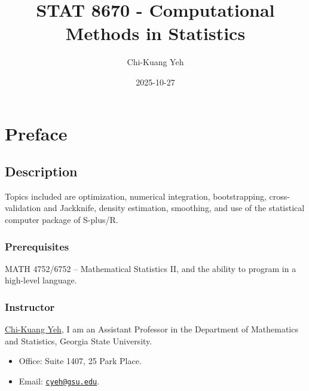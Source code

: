 \documentclass[
  letterpaper,
  DIV=11,
  numbers=noendperiod]{scrreprt}
\title{STAT 8670 - Computational Methods in Statistics}
\author{Chi-Kuang Yeh}
\date{2025-10-27}
\providecommand{\tightlist}{%
  \setlength{\itemsep}{0pt}\setlength{\parskip}{0pt}}
\renewcommand*\contentsname{Table of contents}
\newcommand\contentsname{Table of contents}
\begin{document}
\maketitle

\renewcommand*\contentsname{Table of contents}
{
\hypersetup{linkcolor=}
\setcounter{tocdepth}{2}
\tableofcontents
}


\chapter*{Preface}\label{preface}


\section*{Description}\label{description}


Topics included are optimization, numerical integration, bootstrapping,
cross-validation and Jackknife, density estimation, smoothing, and use
of the statistical computer package of S-plus/R.

\subsection*{Prerequisites}\label{prerequisites}

MATH 4752/6752 -- Mathematical Statistics II, and the ability to program
in a high-level language.

\subsection*{Instructor}\label{instructor}

\href{https://chikuang.github.io/}{Chi-Kuang Yeh}, I am an Assistant
Professor in the Department of Mathematics and Statistics, Georgia State
University.

\begin{itemize}
\tightlist
\item
  Office: Suite 1407, 25 Park Place.
\item
  Email: \href{mailto:cyeh@gsu.edu}{\nolinkurl{cyeh@gsu.edu}}.
\end{itemize}
\end{document}
